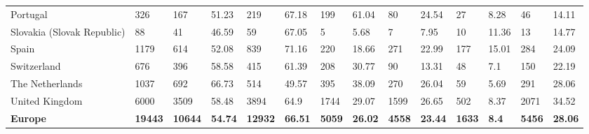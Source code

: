 \begin{tabular}{llllllllllllll}
  Portugal & 326 & 167 & 51.23 & 219 & 67.18 & 199 & 61.04 & 80 & 24.54 & 27 & 8.28 & 46 & 14.11 \\ 
  Slovakia (Slovak Republic) & 88 & 41 & 46.59 & 59 & 67.05 & 5 & 5.68 & 7 & 7.95 & 10 & 11.36 & 13 & 14.77 \\ 
  Spain & 1179 & 614 & 52.08 & 839 & 71.16 & 220 & 18.66 & 271 & 22.99 & 177 & 15.01 & 284 & 24.09 \\ 
  Switzerland & 676 & 396 & 58.58 & 415 & 61.39 & 208 & 30.77 & 90 & 13.31 & 48 & 7.1 & 150 & 22.19 \\ 
  The Netherlands & 1037 & 692 & 66.73 & 514 & 49.57 & 395 & 38.09 & 270 & 26.04 & 59 & 5.69 & 291 & 28.06 \\ 
  United Kingdom & 6000 & 3509 & 58.48 & 3894 & 64.9 & 1744 & 29.07 & 1599 & 26.65 & 502 & 8.37 & 2071 & 34.52 \\ 
  \textbf{\textbf{Europe}} & \textbf{19443} & \textbf{10644} & \textbf{54.74} & \textbf{12932} & \textbf{66.51} & \textbf{5059} & \textbf{26.02} & \textbf{4558} & \textbf{23.44} & \textbf{1633} & \textbf{8.4} & \textbf{5456} & \textbf{28.06} \\ 
   \bottomrule
\end{tabular}
